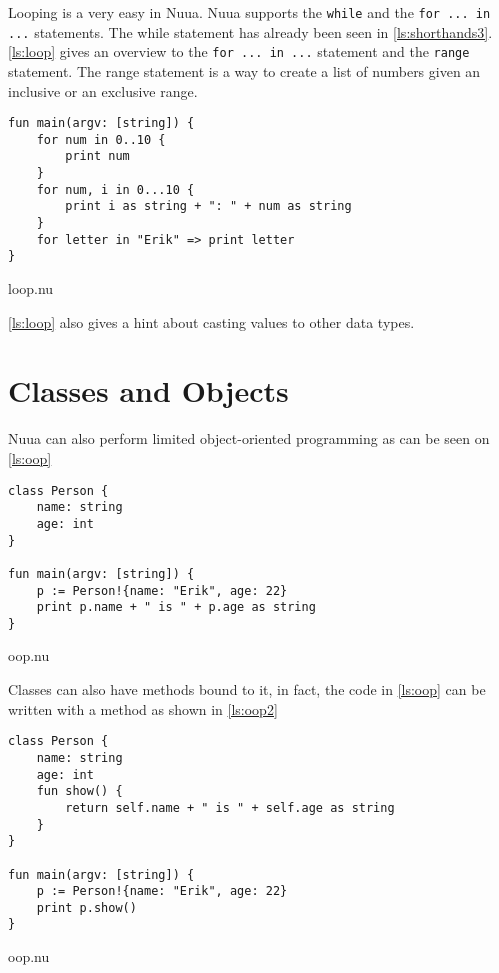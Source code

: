 Looping is a very easy in Nuua. Nuua supports the \texttt{while} and the \texttt{for ... in ...} statements. The while statement has already been seen
in \autoref{ls:shorthands3}. \autoref{ls:loop} gives an overview to the \texttt{for ... in ...} statement and the \texttt{range} statement.
The range statement is a way to create a list of numbers given an inclusive or an exclusive range.\\

\begin{code}
\begin{verbatim}
fun main(argv: [string]) {
    for num in 0..10 {
        print num
    }
    for num, i in 0...10 {
        print i as string + ": " + num as string
    }
    for letter in "Erik" => print letter
}
\end{verbatim}
\caption{loop.nu}
\label{ls:loop}
\end{code}

\autoref{ls:loop} also gives a hint about casting values to other data types.

\section{Classes and Objects}

Nuua can also perform limited object-oriented programming as can be seen on \autoref{ls:oop}\\

\begin{code}
\begin{verbatim}
class Person {
    name: string
    age: int
}

fun main(argv: [string]) {
    p := Person!{name: "Erik", age: 22}
    print p.name + " is " + p.age as string
}
\end{verbatim}
\caption{oop.nu}
\label{ls:oop}
\end{code}

Classes can also have methods bound to it, in fact, the code in \autoref{ls:oop} can be written with a method as shown in \autoref{ls:oop2}\\

\begin{code}
\begin{verbatim}
class Person {
    name: string
    age: int
    fun show() {
        return self.name + " is " + self.age as string
    }
}

fun main(argv: [string]) {
    p := Person!{name: "Erik", age: 22}
    print p.show()
}
\end{verbatim}
\caption{oop.nu}
\label{ls:oop2}
\end{code}
